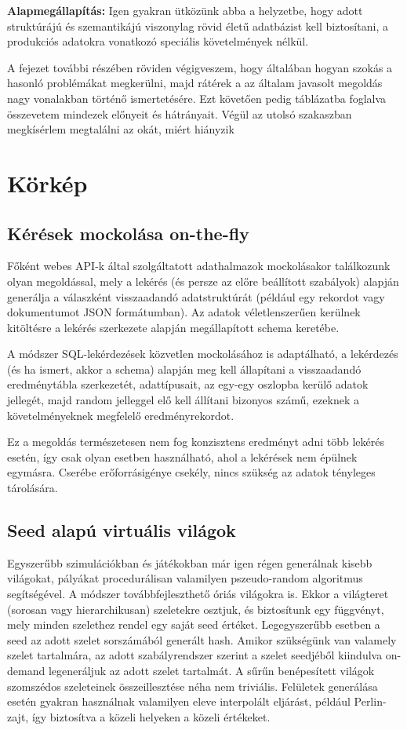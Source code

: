 \documentclass[
    parspace,
    noindent,
    nohyp,
]{elteiktdk}[2023/04/10]
\newcommand{\thesispar}[1]{
\vspace{1em}
\hspace{0.7cm}\parbox[left][][c]{15.8cm}{\linespread{1.2}\selectfont #1}
\vspace{1em}
}
\begin{document}
\thesispar{
    \textbf{Alapmegállapítás:} Igen gyakran ütközünk abba a helyzetbe, hogy adott struktúrájú és szemantikájú
    viszonylag rövid életű adatbázist kell biztosítani,
    a produkciós adatokra vonatkozó speciális követelmények nélkül.
}

A fejezet további részében röviden végigveszem, hogy általában hogyan szokás a hasonló problémákat megkerülni,
majd rátérek a az általam javasolt megoldás nagy vonalakban történő ismertetésére.
Ezt követően pedig táblázatba foglalva összevetem mindezek előnyeit és hátrányait.
Végül az utolsó szakaszban megkísérlem megtalálni az okát,
miért hiányzik 

\section{Körkép}

\subsection{Kérések mockolása on-the-fly}

Főként webes API-k által szolgáltatott adathalmazok mockolásakor találkozunk olyan megoldással,
mely a lekérés (és persze az előre beállított szabályok)
alapján generálja a válaszként visszaadandó adatstruktúrát
(például egy rekordot vagy dokumentumot JSON formátumban).
Az adatok véletlenszerűen kerülnek kitöltésre a lekérés szerkezete alapján megállapított schema keretébe.

A módszer SQL-lekérdezések közvetlen mockolásához is adaptálható,
a lekérdezés (és ha ismert, akkor a schema) alapján meg kell állapítani
a visszaadandó eredménytábla szerkezetét, adattípusait,
az egy-egy oszlopba kerülő adatok jellegét,
majd random jelleggel elő kell állítani bizonyos számű, ezeknek a követelményeknek megfelelő eredményrekordot.

Ez a megoldás természetesen nem fog konzisztens eredményt adni több lekérés esetén,
így csak olyan esetben használható, ahol a lekérések nem épülnek egymásra.
Cserébe erőforrásigénye csekély, nincs szükség az adatok tényleges tárolására.

\subsection{Seed alapú virtuális világok}

Egyszerűbb szimulációkban és játékokban már igen régen generálnak kisebb világokat,
pályákat procedurálisan valamilyen pszeudo-random algoritmus segítségével.
A módszer továbbfejleszthető óriás világokra is.
Ekkor a világteret (sorosan vagy hierarchikusan) szeletekre osztjuk, és biztosítunk egy függvényt,
mely minden szelethez rendel egy saját seed értéket.
Legegyszerűbb esetben a seed az adott szelet sorszámából generált hash.
Amikor szükségünk van valamely szelet tartalmára, az adott szabályrendszer szerint
a szelet seedjéből kiindulva on-demand legeneráljuk az adott szelet tartalmát.
A sűrűn benépesített világok szomszédos szeleteinek összeillesztése néha nem triviális.
Felületek generálása esetén gyakran használnak valamilyen eleve interpolált eljárást, például Perlin-zajt,
így biztosítva a közeli helyeken a közeli értékeket.
\end{document}
